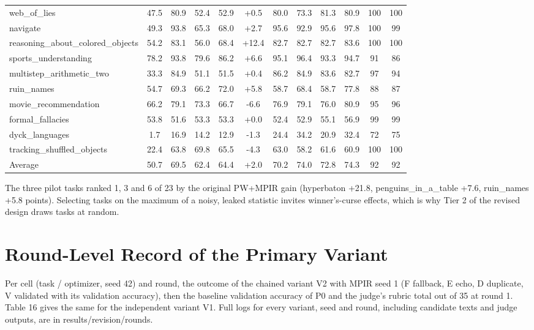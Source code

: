 \documentclass{ieeeaccess}
\begin{document}
\begin{table}[htbp]
{\begin{tabular}{lccccccccccc}
web\_\allowbreak{}of\_\allowbreak{}lies & 47.5 & 80.9 & 52.4 & 52.9 & +0.5 & 80.0 & 73.3 & 81.3 & 80.9 & 100 & 100 \\
navigate & 49.3 & 93.8 & 65.3 & 68.0 & +2.7 & 95.6 & 92.9 & 95.6 & 97.8 & 100 & 99 \\
reasoning\_\allowbreak{}about\_\allowbreak{}colored\_\allowbreak{}objects & 54.2 & 83.1 & 56.0 & 68.4 & +12.4 & 82.7 & 82.7 & 82.7 & 83.6 & 100 & 100 \\
sports\_\allowbreak{}understanding & 78.2 & 93.8 & 79.6 & 86.2 & +6.6 & 95.1 & 96.4 & 93.3 & 94.7 & 91 & 86 \\
multistep\_\allowbreak{}arithmetic\_\allowbreak{}two & 33.3 & 84.9 & 51.1 & 51.5 & +0.4 & 86.2 & 84.9 & 83.6 & 82.7 & 97 & 94 \\
ruin\_\allowbreak{}names & 54.7 & 69.3 & 66.2 & 72.0 & +5.8 & 58.7 & 68.4 & 58.7 & 77.8 & 88 & 87 \\
movie\_\allowbreak{}recommendation & 66.2 & 79.1 & 73.3 & 66.7 & -6.6 & 76.9 & 79.1 & 76.0 & 80.9 & 95 & 96 \\
formal\_\allowbreak{}fallacies & 53.8 & 51.6 & 53.3 & 53.3 & +0.0 & 52.4 & 52.9 & 55.1 & 56.9 & 99 & 99 \\
dyck\_\allowbreak{}languages & 1.7 & 16.9 & 14.2 & 12.9 & -1.3 & 24.4 & 34.2 & 20.9 & 32.4 & 72 & 75 \\
tracking\_\allowbreak{}shuffled\_\allowbreak{}objects & 22.4 & 63.8 & 69.8 & 65.5 & -4.3 & 63.0 & 58.2 & 61.6 & 60.9 & 100 & 100 \\
Average & 50.7 & 69.5 & 62.4 & 64.4 & +2.0 & 70.2 & 74.0 & 72.8 & 74.3 & 92 & 92 \\
\bottomrule
\end{tabular}
}
\end{table}

The three pilot tasks ranked 1, 3 and 6 of 23 by the original PW+MPIR gain (hyperbaton +21.8, penguins\_\allowbreak{}in\_\allowbreak{}a\_\allowbreak{}table +7.6, ruin\_\allowbreak{}names +5.8 points). Selecting tasks on the maximum of a noisy, leaked statistic invites winner's-curse effects, which is why Tier 2 of the revised design draws tasks at random.

\section{Round-Level Record of the Primary Variant}

Per cell (task / optimizer, seed 42) and round, the outcome of the chained variant V2 with MPIR seed 1 (F fallback, E echo, D duplicate, V validated with its validation accuracy), then the baseline validation accuracy of P0 and the judge's rubric total out of 35 at round 1. Table 16 gives the same for the independent variant V1. Full logs for every variant, seed and round, including candidate texts and judge outputs, are in results/revision/rounds.
\end{document}
